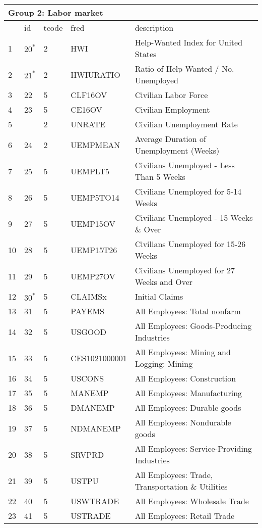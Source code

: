 \begin{table}[ht] 
\centering 
\begin{tabular}{lllll}
\multicolumn{5}{l}{Group 2: Labor market} \\
\toprule
 & id & tcode & fred & description \\
\midrule
1 & $20^*$ & 2 & HWI & Help-Wanted Index for United States \\
2 & $21^*$ & 2 & HWIURATIO & Ratio of Help Wanted / No. Unemployed \\
3 & 22 & 5 & CLF16OV & Civilian Labor Force \\
4 & 23 & 5 & CE16OV & Civilian Employment \\
5 &  & 2 & UNRATE & Civilian Unemployment Rate \\
6 & 24 & 2 & UEMPMEAN & Average Duration of Unemployment (Weeks) \\
7 & 25 & 5 & UEMPLT5 & Civilians Unemployed - Less Than 5 Weeks \\
8 & 26 & 5 & UEMP5TO14 & Civilians Unemployed for 5-14 Weeks \\
9 & 27 & 5 & UEMP15OV & Civilians Unemployed - 15 Weeks \& Over \\
10 & 28 & 5 & UEMP15T26 & Civilians Unemployed for 15-26 Weeks \\
11 & 29 & 5 & UEMP27OV & Civilians Unemployed for 27 Weeks and Over \\
12 & $30^*$ & 5 & CLAIMSx & Initial Claims \\
13 & 31 & 5 & PAYEMS & All Employees: Total nonfarm \\
14 & 32 & 5 & USGOOD & All Employees: Goods-Producing Industries \\
15 & 33 & 5 & CES1021000001 & All Employees: Mining and Logging: Mining \\
16 & 34 & 5 & USCONS & All Employees: Construction \\
17 & 35 & 5 & MANEMP & All Employees: Manufacturing \\
18 & 36 & 5 & DMANEMP & All Employees: Durable goods \\
19 & 37 & 5 & NDMANEMP & All Employees: Nondurable goods \\
20 & 38 & 5 & SRVPRD & All Employees: Service-Providing Industries \\
21 & 39 & 5 & USTPU & All Employees: Trade, Transportation \& Utilities \\
22 & 40 & 5 & USWTRADE & All Employees: Wholesale Trade \\
23 & 41 & 5 & USTRADE & All Employees: Retail Trade \\

\end{tabular}
\end{table}
